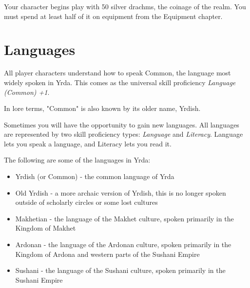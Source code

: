 \begin{multicols}{2}
Your character begins play with 50 silver drachms, the coinage of
the realm. You must spend at least half of it on equipment from the
Equipment chapter.

\section{Languages}

All player characters understand how to speak Common, the language most
widely spoken in Yrda. This comes as the universal skill proficiency
\textit{Language (Common) +1}.  

In lore terms, "Common" is also known by its older name, Yrdish.

Sometimes you will have the opportunity to gain new languages. All languages
are represented by two skill proficiency types: \textit{Language} and \textit{Literacy}.
Language lets you speak a language, and Literacy lets you read it.

The following are some of the languages in Yrda:

\begin{itemize}
  \item Yrdish (or Common) - the common language of Yrda
  \item Old Yrdish - a more archaic version of Yrdish, this is no longer spoken
    outside of scholarly circles or some lost cultures
  \item Makhetian - the language of the Makhet culture, spoken primarily in the
    Kingdom of Makhet
  \item Ardonan - the language of the Ardonan culture, spoken primarily in the
    Kingdom of Ardona and western parts of the Sushani Empire
  \item Sushani - the language of the Sushani culture, spoken primarily in the
    Sushani Empire
\end{itemize}

\end{multicols}
